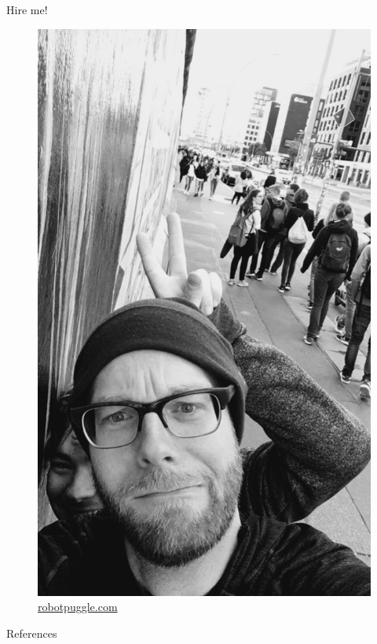 \documentclass[10pt]{beamer}
\begin{document}
\begin{frame}[fragile]{Hire me!}
\begin{figure}
    \centering
    \includegraphics[scale=0.15]{images/bunny_ears_me.jpg}
    \caption{\url{robotpuggle.com}}
\end{figure}
\end{frame}

\begin{frame}[allowframebreaks]{References}
  
  \footnotesize{}
\end{frame}

\end{document}
